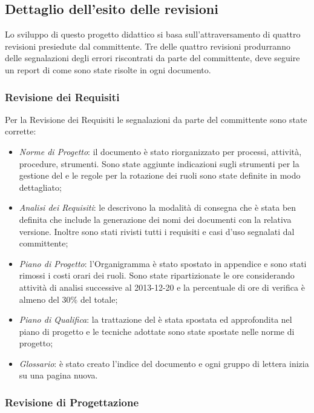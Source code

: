 	\subsection{Dettaglio dell'esito delle revisioni}
	Lo sviluppo di questo progetto didattico si basa sull'attraversamento di quattro revisioni presiedute dal committente. Tre delle quattro revisioni produrranno delle segnalazioni degli errori riscontrati da parte del committente, deve seguire un report di come sono state risolte in ogni documento.
		
		\subsubsection{Revisione dei Requisiti}
		Per la Revisione dei Requisiti le segnalazioni da parte del committente sono state corrette:
		
		\begin{itemize}
			\item \emph{Norme di Progetto}: il documento è stato riorganizzato per processi, attività, procedure, strumenti. Sono state aggiunte indicazioni sugli strumenti per la gestione del  e le regole per la rotazione dei ruoli sono state definite in modo dettagliato;
			\item \emph{Analisi dei Requisiti}: le \NormeDiProgetto{} descrivono la modalità di consegna che è stata ben definita che include la generazione dei nomi dei documenti con la relativa versione. Inoltre sono stati rivisti tutti i requisiti e casi d'uso segnalati dal committente;
			\item \emph{Piano di Progetto}: l'Organigramma è stato spostato in appendice e sono stati rimossi i costi orari dei ruoli. Sono state ripartizionate le ore considerando attività di analisi successive al 2013-12-20 e la percentuale di ore di verifica è almeno del 30\% del totale;
			\item \emph{Piano di Qualifica}: la trattazione del  è stata spostata ed approfondita nel piano di progetto e le tecniche adottate sono state spostate nelle norme di progetto;
			\item \emph{Glossario}: è stato creato l'indice del documento e ogni gruppo di lettera inizia su una pagina nuova.
		\end{itemize}
		
		\subsubsection{Revisione di Progettazione}

